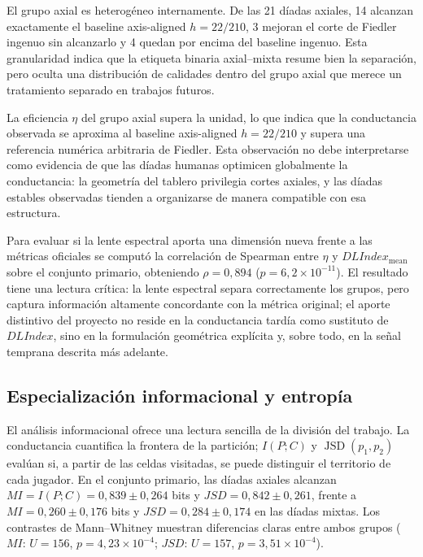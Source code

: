 \documentclass[journal]{IEEEtran}
\begin{document}
El grupo axial es heterogéneo internamente. De las 21 díadas axiales, 14 alcanzan exactamente el baseline axis-aligned $h = 22/210$, 3 mejoran el corte de Fiedler ingenuo sin alcanzarlo y 4 quedan por encima del baseline ingenuo. Esta granularidad indica que la etiqueta binaria axial--mixta resume bien la separación, pero oculta una distribución de calidades dentro del grupo axial que merece un tratamiento separado en trabajos futuros.

La eficiencia $\eta$ del grupo axial supera la unidad, lo que indica que la conductancia observada se aproxima al baseline axis-aligned $h = 22/210$ y supera una referencia numérica arbitraria de Fiedler. Esta observación no debe interpretarse como evidencia de que las díadas humanas optimicen globalmente la conductancia: la geometría del tablero privilegia cortes axiales, y las díadas estables observadas tienden a organizarse de manera compatible con esa estructura.

Para evaluar si la lente espectral aporta una dimensión nueva frente a las métricas oficiales se computó la correlación de Spearman entre $\eta$ y $DLIndex_{\mathrm{mean}}$ sobre el conjunto primario, obteniendo $\rho = 0{,}894$ ($p = 6{,}2 \times 10^{-11}$). El resultado tiene una lectura crítica: la lente espectral separa correctamente los grupos, pero captura información altamente concordante con la métrica original; el aporte distintivo del proyecto no reside en la conductancia tardía como sustituto de $DLIndex$, sino en la formulación geométrica explícita y, sobre todo, en la señal temprana descrita más adelante.

\subsection{Especialización informacional y entropía}\label{sec:res-entropia}

El análisis informacional ofrece una lectura sencilla de la división del trabajo. La conductancia cuantifica la frontera de la partición; $I(P;C)$ y $\operatorname{JSD}(p_1,p_2)$ evalúan si, a partir de las celdas visitadas, se puede distinguir el territorio de cada jugador. En el conjunto primario, las díadas axiales alcanzan $MI = I(P;C) = 0{,}839 \pm 0{,}264$ bits y $JSD = 0{,}842 \pm 0{,}261$, frente a $MI = 0{,}260 \pm 0{,}176$ bits y $JSD = 0{,}284 \pm 0{,}174$ en las díadas mixtas. Los contrastes de Mann--Whitney muestran diferencias claras entre ambos grupos ($MI$: $U=156$, $p = 4{,}23 \times 10^{-4}$; $JSD$: $U=157$, $p = 3{,}51 \times 10^{-4}$).
\end{document}
